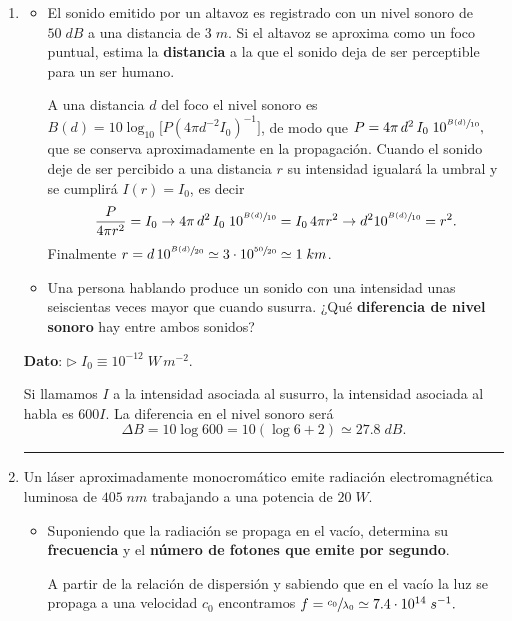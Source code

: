 \documentclass[a4paper,12pt]{exam}
\newcommand{\halmos}{\vspace*{-7mm}
	
					\begin{flushright}
						\rule{1mm}{2.5mm} 
					\end{flushright}\vspace*{-6mm}
						
					  }
\renewcommand{\qed}{\halmos}
\begin{document}
\begin{enumerate}
		\newpage
		\item 
			\begin{itemize}
				\item[a)] El sonido emitido por un altavoz es registrado con un nivel sonoro de $50\;dB$ a una 
distancia de $3\;m$. Si el altavoz se aproxima como un foco puntual, estima la \textbf{distancia} a la que el sonido deja de ser perceptible para un ser humano.
  \begin{mdframed}[backgroundcolor=yellow!20]  
  A una distancia $d$ del foco el nivel sonoro es $B(d)=10\log_{10}\big[P(4\pi d^{-2}I_0)^{-1}\big]$, de modo que $P=4\pi\,d^2\,I_0\;10^{\sfrac{B(d)}{10}},$ que se conserva aproximadamente en la propagación.  Cuando el sonido deje de ser percibido a una distancia $r$ su intensidad igualará la umbral y se cumplirá $I(r)=I_0$, es decir
  \[\frac{P}{4\pi r^2}=I_0\rightarrow 4\pi\,d^2\,I_0\;10^{\sfrac{B(d)}{10}}=I_0\,4\pi r^2\rightarrow d^210^{\sfrac{B(d)}{10}}=r^2. \]
  Finalmente $r=d\,10^{\sfrac{B(d)}{20}}\simeq 3\cdot 10^{\sfrac{50}{20}}\simeq 1\;km$.
  \end{mdframed}
				\item[b)] Una persona hablando produce un sonido con una intensidad unas seiscientas veces mayor que 						cuando susurra. ¿Qué \textbf{diferencia de nivel sonoro} hay entre ambos sonidos?
				\vspace*{.2mm}					
			\end{itemize}
			\begin{footnotesize} 
            	\textbf{Dato}: \hspace*{2ex} $\triangleright\;I_0\equiv 10^{-12}\;W\,m^{-2}$.			\end{footnotesize}
       \begin{mdframed}[backgroundcolor=yellow!20]  
        	Si llamamos $I$ a la intensidad asociada al susurro, la intensidad asociada al habla es $600I$. La diferencia en el nivel sonoro será
        	\[\Delta B=10\log600=10(\log 6+2)\simeq 27.8\;dB.\]
       \end{mdframed}
		\qed
		
\newpage

		

		\item 	Un láser aproximadamente monocromático emite radiación electromagnética luminosa de $405\;nm$ trabajando a una potencia de $20\;W$. 
			\begin{itemize}
				\item[a)] Suponiendo que la radiación se propaga en el vacío, determina su \textbf{frecuencia} y el \textbf{número de fotones que emite por segundo}.
				\begin{mdframed}[backgroundcolor=yellow!20]  
				A partir de la relación de dispersión y sabiendo que en el vacío la luz se propaga a una velocidad $c_0$ encontramos ${f=\sfrac{c_0}{\lambda_0}\simeq 7.4\cdot 10^{14}\;s^{-1}.}$ 
				

\end{mdframed}
\end{itemize}
\end{enumerate}
\end{document}
